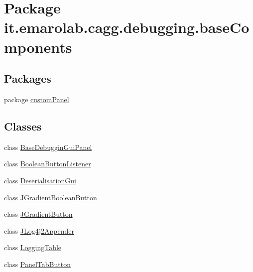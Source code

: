 \hypertarget{namespaceit_1_1emarolab_1_1cagg_1_1debugging_1_1baseComponents}{\section{Package it.\-emarolab.\-cagg.\-debugging.\-base\-Components}
\label{namespaceit_1_1emarolab_1_1cagg_1_1debugging_1_1baseComponents}
}
\subsection*{Packages}
\begin{DoxyCompactItemize}
\item 
package \hyperlink{namespaceit_1_1emarolab_1_1cagg_1_1debugging_1_1baseComponents_1_1customPanel}{custom\-Panel}
\end{DoxyCompactItemize}
\subsection*{Classes}
\begin{DoxyCompactItemize}
\item 
class \hyperlink{classit_1_1emarolab_1_1cagg_1_1debugging_1_1baseComponents_1_1BaseDebugginGuiPanel}{Base\-Debuggin\-Gui\-Panel}
\item 
class \hyperlink{classit_1_1emarolab_1_1cagg_1_1debugging_1_1baseComponents_1_1BooleanButtonListener}{Boolean\-Button\-Listener}
\item 
class \hyperlink{classit_1_1emarolab_1_1cagg_1_1debugging_1_1baseComponents_1_1DeserialisationGui}{Deserialisation\-Gui}
\item 
class \hyperlink{classit_1_1emarolab_1_1cagg_1_1debugging_1_1baseComponents_1_1JGradientBooleanButton}{J\-Gradient\-Boolean\-Button}
\item 
class \hyperlink{classit_1_1emarolab_1_1cagg_1_1debugging_1_1baseComponents_1_1JGradientButton}{J\-Gradient\-Button}
\item 
class \hyperlink{classit_1_1emarolab_1_1cagg_1_1debugging_1_1baseComponents_1_1JLog4j2Appender}{J\-Log4j2\-Appender}
\item 
class \hyperlink{classit_1_1emarolab_1_1cagg_1_1debugging_1_1baseComponents_1_1LoggingTable}{Logging\-Table}
\item 
class \hyperlink{classit_1_1emarolab_1_1cagg_1_1debugging_1_1baseComponents_1_1PanelTabButton}{Panel\-Tab\-Button}
\end{DoxyCompactItemize}
